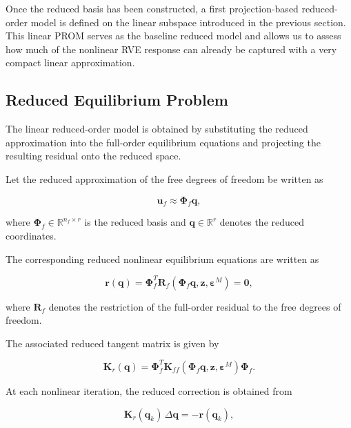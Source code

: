 \documentclass[11pt,a4paper]{article}
\begin{document}
Once the reduced basis has been constructed, a first projection-based reduced-order model is defined on the linear subspace introduced in the previous section. This linear PROM serves as the baseline reduced model and allows us to assess how much of the nonlinear RVE response can already be captured with a very compact linear approximation.

\subsection{Reduced Equilibrium Problem}

The linear reduced-order model is obtained by substituting the reduced approximation into the full-order equilibrium equations and projecting the resulting residual onto the reduced space.

Let the reduced approximation of the free degrees of freedom be written as

\begin{equation}
\mathbf{u}_f \approx \mathbf{\Phi}_f \mathbf{q},
\end{equation}

where $\mathbf{\Phi}_f \in \mathbb{R}^{n_f \times r}$ is the reduced basis and $\mathbf{q} \in \mathbb{R}^{r}$ denotes the reduced coordinates.

The corresponding reduced nonlinear equilibrium equations are written as

\begin{equation}
\mathbf{r}(\mathbf{q})
=
\mathbf{\Phi}_f^T
\mathbf{R}_f\!\left(\mathbf{\Phi}_f \mathbf{q},\mathbf{z},\boldsymbol{\varepsilon}^{M}\right)
=
\mathbf{0},
\end{equation}

where $\mathbf{R}_f$ denotes the restriction of the full-order residual to the free degrees of freedom.

The associated reduced tangent matrix is given by

\begin{equation}
\mathbf{K}_r(\mathbf{q})
=
\mathbf{\Phi}_f^T
\mathbf{K}_{ff}
\!\left(\mathbf{\Phi}_f \mathbf{q},\mathbf{z},\boldsymbol{\varepsilon}^{M}\right)
\mathbf{\Phi}_f.
\end{equation}

At each nonlinear iteration, the reduced correction is obtained from

\begin{equation}
\mathbf{K}_r(\mathbf{q}_k)\,\Delta \mathbf{q}
=
-
\mathbf{r}(\mathbf{q}_k),
\end{equation}
\end{document}
